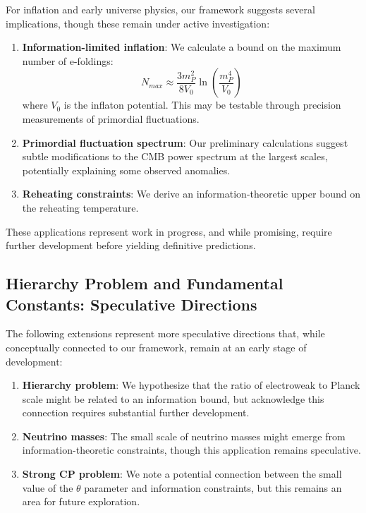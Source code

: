 \documentclass[12pt]{article}
\theoremstyle{plain}
\theoremstyle{definition}
\theoremstyle{remark}
\begin{document}
For inflation and early universe physics, our framework suggests several implications, though these remain under active investigation:

\begin{enumerate}
\item \textbf{Information-limited inflation}: We calculate a bound on the maximum number of e-foldings:
\begin{equation}
N_{max} \approx \frac{3 m_P^2}{8 V_0} \ln\left(\frac{m_P^4}{V_0}\right)
\end{equation}
where $V_0$ is the inflaton potential. This may be testable through precision measurements of primordial fluctuations.

\item \textbf{Primordial fluctuation spectrum}: Our preliminary calculations suggest subtle modifications to the CMB power spectrum at the largest scales, potentially explaining some observed anomalies.

\item \textbf{Reheating constraints}: We derive an information-theoretic upper bound on the reheating temperature.
\end{enumerate}

These applications represent work in progress, and while promising, require further development before yielding definitive predictions.

\subsection{Hierarchy Problem and Fundamental Constants: Speculative Directions}

The following extensions represent more speculative directions that, while conceptually connected to our framework, remain at an early stage of development:

\begin{enumerate}
\item \textbf{Hierarchy problem}: We hypothesize that the ratio of electroweak to Planck scale might be related to an information bound, but acknowledge this connection requires substantial further development.

\item \textbf{Neutrino masses}: The small scale of neutrino masses might emerge from information-theoretic constraints, though this application remains speculative.

\item \textbf{Strong CP problem}: We note a potential connection between the small value of the $\theta$ parameter and information constraints, but this remains an area for future exploration.
\end{enumerate}
\end{document}
